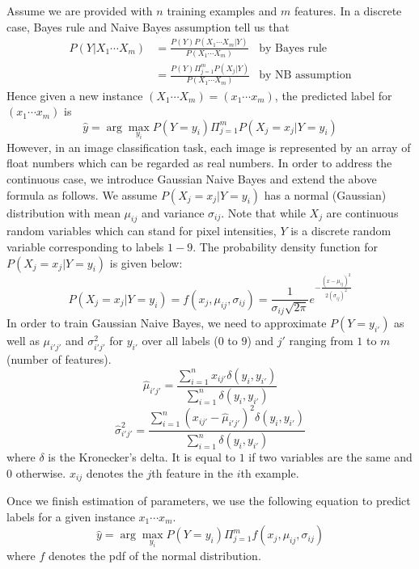 \documentclass{acm_proc_article-sp}
\begin{document}
Assume we are provided with $n$ training examples and $m$ features. In a discrete case, Bayes rule and Naive Bayes assumption tell us that
\begin{align*}
P(Y | X_1 \cdots X_m ) &= \frac{P(Y) P ( X_1 \cdots X_m| Y )}{P(X_1 \cdots X_m)} &\textrm{by Bayes rule}\\
&= \frac{P(Y) \Pi_{j=1}^m  P ( X_j | Y )}{P(X_1 \cdots X_m)} &\textrm{by NB assumption}
\end{align*}
Hence given a new instance $(X_1\cdots X_m) = (x_1\cdots x_m)$, the predicted label for $(x_1\cdots x_m)$ is
\begin{equation}
\hat{y} = \arg \max_{y_i} P(Y = y_i) \Pi_{j=1}^m P(X_j=x_j | Y = y_i) \label{eq:max}
\end{equation}
However, in an image classification task, each image is represented by an array of float numbers which can be regarded as real numbers. In order to address the continuous case, we introduce Gaussian Naive Bayes and extend the above formula as follows. We assume $P(X_j=x_j | Y = y_i)$ has a normal (Gaussian) distribution with mean $\mu_{ij}$ and variance $\sigma_{ij}$. Note that while $X_j$ are continuous random variables which can stand for pixel intensities,  $Y$ is a discrete random variable corresponding to labels $1 - 9$.  The probability density function for $P(X_j=x_j | Y = y_i)$ is given below:
\begin{equation}
P(X_j=x_j | Y = y_i) =  f (x_j, \mu_{ij}, \sigma_{ij} ) =\frac{1}{\sigma_{ij}\sqrt{2\pi}}e^{-\frac{(x-\mu_{ij})^2}{2(\sigma_{ij})^2}} \label{eq:pdf}
\end{equation}
In order to train Gaussian Naive Bayes, we need to approximate $P(Y=y_{i'})$ as well as $\mu_{i'j'}$ and  $\sigma_{i'j'}^2$ for $y_{i'}$ over all labels ($0$ to $9$) and $j'$ ranging from $1$ to $m$ (number of features). 
\begin{equation}
\hat{\mu}_{i'j'} = \frac{\sum_{i=1}^n x_{ij'} \delta(y_{i}, y_{i'})}{\sum_{i=1}^n \delta(y_{i}, y_{i'})} \label{eq:mean}
\end{equation}
\begin{equation}
\hat{\sigma}_{i'j'}^2 =  \frac{\sum_{i=1}^n ( x_{ij'}-\hat{\mu}_{i'j'})^2 \delta(y_{i}, y_{i'})}{\sum_{i=1}^n \delta(y_{i}, y_{i'})} \label{eq:var}
\end{equation}
where $\delta$ is the Kronecker's delta. It is equal to $1$ if two variables are the same and $0$ otherwise. $x_{ij}$ denotes the $j$th feature in the $i$th  example.


Once we finish estimation of parameters, we use the following equation to predict labels for a given instance $x_1 \cdots x_m$. 
\begin{equation}
\hat{y} = \arg \max_{y_i} P(Y = y_i) \Pi_{j=1}^m f (x_j, \mu_{ij}, \sigma_{ij} ) \label{eq: argmax}
\end{equation}
where $f$ denotes the pdf of the normal distribution.
\end{document}
